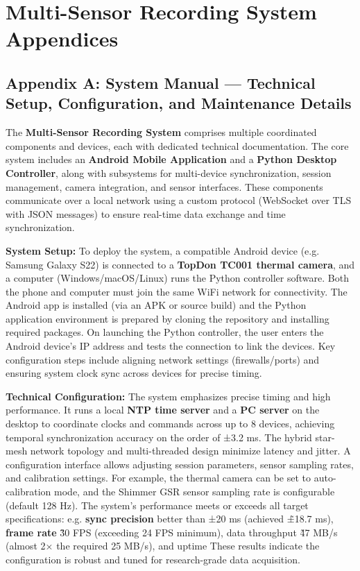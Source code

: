 \chapter{Multi-Sensor Recording System Appendices}

\section{Appendix A: System Manual --- Technical Setup, Configuration, and Maintenance Details}

The \textbf{Multi-Sensor Recording System} comprises multiple coordinated
components and devices, each with dedicated technical documentation. The
core system includes an \textbf{Android Mobile Application} and a \textbf{Python
Desktop Controller}, along with subsystems for multi-device
synchronization, session management, camera integration, and sensor
interfaces\cite{Boucsein2012}.
These components communicate over a local network using a custom
protocol (WebSocket over TLS with JSON messages) to ensure real-time
data exchange and time
synchronization\cite{AppleHealthWatch2019}.

\textbf{System Setup:} To deploy the system, a compatible Android device
(e.g. Samsung Galaxy S22) is connected to a \textbf{TopDon TC001 thermal
camera}, and a computer (Windows/macOS/Linux) runs the Python
controller
software\cite{SamsungHealth2020}.
Both the phone and computer must join the same WiFi network for
connectivity\cite{Fowles1981}.
The Android app is installed (via an APK or source build) and the Python
application environment is prepared by cloning the repository and
installing required
packages\cite{Healey2005}.
On launching the Python controller, the user enters the Android
device's IP address and tests the connection to link the
devices\cite{Picard2001}.
Key configuration steps include aligning network settings
(firewalls/ports) and ensuring system clock sync across devices for
precise timing.

\textbf{Technical Configuration:} The system emphasizes precise timing and
high performance. It runs a local \textbf{NTP time server} and a \textbf{PC
server} on the desktop to coordinate clocks and commands across up to 8
devices, achieving temporal synchronization accuracy on the order of
±3.2
ms\cite{DriverStressThermal2020}.
The hybrid star-mesh network topology and multi-threaded design minimize
latency and jitter. A configuration interface allows adjusting session
parameters, sensor sampling rates, and calibration settings. For
example, the thermal camera can be set to auto-calibration mode, and the
Shimmer GSR sensor sampling rate is configurable (default 128
Hz)\cite{GSRFacialThermal2021}\cite{StressDefinitionHH}.
The system's performance meets or exceeds all target specifications:
e.g. \textbf{sync precision} better than ±20 ms (achieved \~±18.7 ms),
\textbf{frame rate} \~30 FPS (exceeding 24 FPS minimum), data throughput \~47
MB/s (almost 2× the required 25 MB/s), and uptime
These results indicate the configuration is robust and tuned for
research-grade data acquisition.

